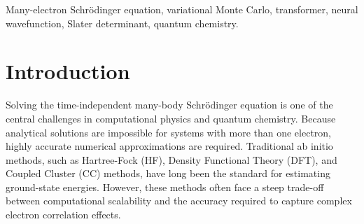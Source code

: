 \begin{abstract}
The application of deep neural networks to Variational Quantum Monte Carlo (VQMC) has
significantly advanced the numerical approximation of ground-state energies for quantum
many-body systems. Among these advancements, the Psiformer architecture—which leverages
self-attention mechanisms to model antisymmetric electron wave functions—has
demonstrated state-of-the-art accuracy. However, the original implementation is built exclusively within
the JAX ecosystem, presenting a barrier to entry for the broader research community
that predominantly utilizes PyTorch. In the interest of scientific reproducibility and computational accessibility, we present an independent open-source PyTorch implementation of the Psiformer architecture. The model design follows von Glehn, Spencer, and Pfau (2023); the code and numerical experiments reported here are the author's own. To validate the implementation, we compute ground-state energies for helium through oxygen and compare them to a Hartree--Fock baseline.
Our results demonstrate that the PyTorch Psiformer consistently recovers significant
electron correlation energy across all tested atoms, confirming that the architecture
is correctly implemented and behaves as expected from variational theory.
By making the framework openly available, this work lowers the barrier for researchers
in computational mathematics, machine learning, and quantum chemistry who wish to
experiment with transformer-based wave functions.
The full source code is made publicly available to facilitate future experimentation and development.
\end{abstract}

\begin{keywords}
Many-electron Schr\"odinger equation, variational Monte Carlo, transformer, neural wavefunction, Slater determinant, quantum chemistry.
\end{keywords}

\section{Introduction}
Solving the time-independent many-body Schr\"odinger equation is one of the central challenges in computational
physics and quantum chemistry. Because analytical solutions are impossible for systems with more than one
electron, highly accurate numerical approximations are required. Traditional ab initio methods,
such as Hartree-Fock (HF), Density Functional Theory (DFT), and Coupled Cluster (CC) methods,
 have long been the standard for estimating ground-state energies.
However, these methods often face a steep trade-off between computational scalability and the accuracy required to capture complex electron correlation effects.


